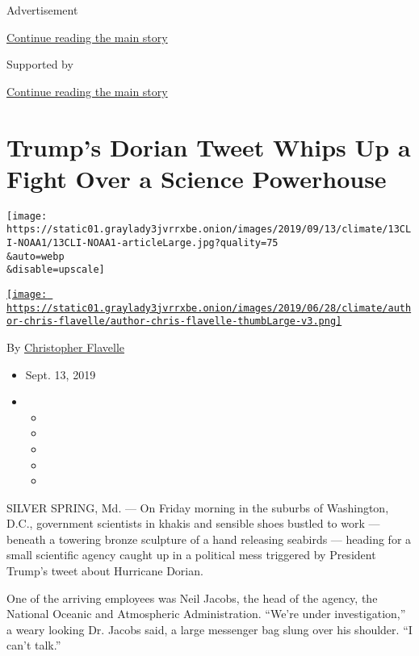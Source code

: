 Advertisement

\protect\hyperlink{after-top}{Continue reading the main story}

Supported by

\protect\hyperlink{after-sponsor}{Continue reading the main story}

\hypertarget{trumps-dorian-tweet-whips-up-a-fight-over-a-science-powerhouse}{%
\section{Trump's Dorian Tweet Whips Up a Fight Over a Science
Powerhouse}\label{trumps-dorian-tweet-whips-up-a-fight-over-a-science-powerhouse}}

\texttt{[image: https://static01.graylady3jvrrxbe.onion/images/2019/09/13/climate/13CLI-NOAA1/13CLI-NOAA1-articleLarge.jpg?quality=75\\\&auto=webp\\\&disable=upscale]}

\href{https://www.nytimes3xbfgragh.onion/by/christopher-flavelle}{\texttt{[image: https://static01.graylady3jvrrxbe.onion/images/2019/06/28/climate/author-chris-flavelle/author-chris-flavelle-thumbLarge-v3.png]}}

By
\href{https://www.nytimes3xbfgragh.onion/by/christopher-flavelle}{Christopher
Flavelle}

\begin{itemize}
\item
  Sept. 13, 2019
\item
  \begin{itemize}
  \item
  \item
  \item
  \item
  \item
  \end{itemize}
\end{itemize}

SILVER SPRING, Md. --- On Friday morning in the suburbs of Washington,
D.C., government scientists in khakis and sensible shoes bustled to work
--- beneath a towering bronze sculpture of a hand releasing seabirds ---
heading for a small scientific agency caught up in a political mess
triggered by President Trump's tweet about Hurricane Dorian.

One of the arriving employees was Neil Jacobs, the head of the agency,
the National Oceanic and Atmospheric Administration. ``We're under
investigation,'' a weary looking Dr. Jacobs said, a large messenger bag
slung over his shoulder. ``I can't talk.''

